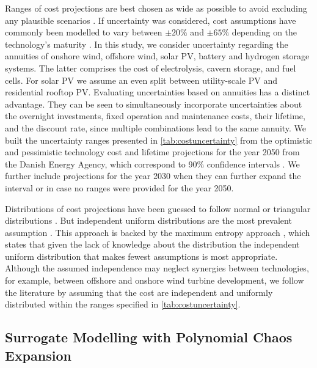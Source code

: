 Ranges of cost projections are best chosen as wide as possible to avoid excluding any plausible scenarios \cite{moret_characterization_2017,mccollum_energy_2020}.
If uncertainty was considered, cost assumptions have commonly been modelled to vary between $\pm20\%$ and $\pm65\%$ depending on the technology's maturity \cite{moret_characterization_2017,shirizadeh_how_2019,pizarro-alonso_uncertainties_2019,li_using_2020,trondle_trade-offs_2020}.
In this study, we consider uncertainty regarding the annuities of
onshore wind, offshore wind, solar PV, battery and hydrogen storage systems.
The latter comprises the cost of
electrolysis, cavern storage, and fuel cells.
For solar PV we assume an even split between utility-scale PV and residential rooftop PV.
Evaluating uncertainties based on annuities has a distinct advantage.
They can be seen to simultaneously incorporate uncertainties about
the overnight investments, fixed operation and maintenance costs,
their lifetime, and the discount rate,
since multiple combinations lead to the same annuity.
We built the uncertainty ranges presented in \cref{tab:costuncertainty}
from the optimistic and pessimistic technology cost
and lifetime projections for the year 2050 from the Danish Energy Agency,
which correspond to 90\% confidence intervals \cite{DEA}.
We further include projections for the year 2030 when they can further expand the interval
or in case no ranges were provided for the year 2050. %


Distributions of cost projections have been guessed
to follow normal \cite{mavromatidis_uncertainty_2018} or triangular distributions \cite{li_using_2020}.
But independent uniform distributions are the most prevalent assumption \cite{moret_characterization_2017,moret_robust_2016,shirizadeh_how_2019,trondle_trade-offs_2020,pilpola_analyzing_2020,Li2017,Trutnevyte2013,lopion_cost_2019}.
This approach is backed by the maximum entropy approach \cite{trondle_trade-offs_2020}, which states that given the lack of knowledge about the distribution
the independent uniform distribution that makes fewest assumptions is most appropriate.
Although the assumed independence may neglect synergies between technologies,
for example, between offshore and onshore wind turbine development,
we follow the literature by assuming that the cost are independent and uniformly distributed within the ranges specified in \cref{tab:costuncertainty}.

\subsection{Surrogate Modelling with Polynomial Chaos Expansion}
\label{sec:surrogate}

